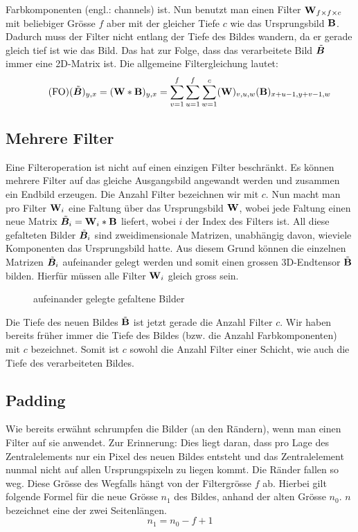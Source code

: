 Farbkomponenten (engl.: channels) ist.
Nun benutzt man einen Filter $\mathbf{W}_{f \times f \times c}$ mit beliebiger Grösse
$f$ aber mit der gleicher Tiefe $c$ wie das Ursprungsbild $\mathbf{B}$.
Dadurch muss der Filter nicht entlang der Tiefe des Bildes wandern, da er
gerade gleich tief ist wie das Bild. Das hat zur Folge, dass das verarbeitete
Bild $\tilde{\bm{B}}$ immer eine 2D-Matrix ist.
Die allgemeine Filtergleichung lautet:
\\
\begin{equation}\tag{FO}
  (\tilde{\bm{B}})_{y,x} = (\mathbf{W} * \mathbf{B})_{y,x} = \sum_{v=1}^{f} \sum_{u=1}^{f} \sum_{w=1}^c (\mathbf{W})_{v,u,w} (\mathbf{B})_{x+u-1,y+v-1,w}
\end{equation}

\para{}
\cite{Goodfellow-et-al-2016}
\cite{deeplearning.ai:cnn}
\cite{wiki:cnn}

\subsection{Mehrere Filter}
Eine Filteroperation ist nicht auf einen einzigen Filter beschränkt. Es können
mehrere Filter auf das gleiche Ausgangsbild angewandt werden und zusammen ein
Endbild erzeugen.
\para{}
Die Anzahl Filter bezeichnen wir mit $c$.
Nun macht man pro Filter $\mathbf{W}_i$ eine Faltung über das Ursprungsbild $\mathbf{W}$, wobei
jede Faltung einen neue Matrix $\tilde{\bm{B}}_i = \mathbf{W}_i * \mathbf{B}$ liefert, wobei $i$ der Index des
Filters ist. All diese gefalteten Bilder $\tilde{\bm{B}}_i$ sind zweidimensionale Matrizen, unabhängig davon, wieviele
Komponenten das Ursprungsbild hatte. Aus diesem Grund können die einzelnen
Matrizen $\tilde{\bm{B}}_i$ aufeinander gelegt werden und somit einen grossen 3D-Endtensor
$\tilde{\mathbf{B}}$ bilden.
Hierfür müssen alle Filter $\mathbf{W}_i$ gleich gross sein.
\begin{figure}[h!]
  \caption{aufeinander gelegte gefaltene Bilder}

\end{figure}
Die Tiefe des neuen Bildes $\tilde{\mathbf{B}}$ ist jetzt gerade die Anzahl Filter $c$.
Wir haben bereits früher immer die Tiefe des Bildes (bzw. die Anzahl
Farbkomponenten) mit $c$ bezeichnet. Somit ist $c$ sowohl die Anzahl Filter
einer Schicht, wie auch die Tiefe des verarbeiteten Bildes.

\para{}
\cite{Goodfellow-et-al-2016}
\cite{deeplearning.ai:cnn}

\subsection{Padding}
Wie bereits erwähnt schrumpfen die Bilder (an den Rändern), wenn man einen Filter auf sie anwendet.
Zur Erinnerung: Dies liegt daran, dass pro Lage des Zentralelements nur ein Pixel
des neuen Bildes entsteht und das Zentralelement nunmal nicht auf allen
Ursprungspixeln zu liegen kommt. Die Ränder fallen so weg. Diese Grösse des
Wegfalls hängt von der Filtergrösse $f$ ab. Hierbei gilt folgende Formel für die
neue Grösse $n_1$ des Bildes, anhand der alten Grösse $n_0$. $n$ bezeichnet
eine der zwei Seitenlängen.
\begin{equation}
  n_1 = n_0 - f + 1
\end{equation}

